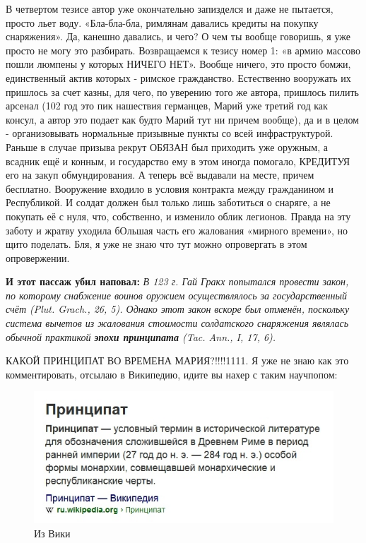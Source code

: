 В четвертом тезисе автор уже окончательно запизделся и даже не пытается, просто льет воду. «Бла-бла-бла, римлянам давались кредиты на покупку снаряжения». Да, канешно давались, и чего? О чем ты вообще говоришь, я уже просто не могу это разбирать. Возвращаемся к тезису номер 1: «в армию массово пошли люмпены у которых НИЧЕГО НЕТ». Вообще ничего, это просто бомжи, единственный актив которых - римское гражданство. Естественно вооружать их пришлось за счет казны, для чего, по уверению того же автора, пришлось пилить арсенал (102 год это пик нашествия германцев, Марий уже третий год как консул, а автор это подает как будто Марий тут ни причем вообще), да и в целом - организовывать нормальные призывные пункты со всей инфраструктурой. Раньше в случае призыва рекрут ОБЯЗАН был приходить уже оружным, а всадник ещё и конным, и государство ему в этом иногда помогало, КРЕДИТУЯ его на закуп обмундирования. А теперь всё выдавали на месте, причем бесплатно. Вооружение входило в условия контракта между гражданином и Республикой. И солдат должен был только лишь заботиться о снаряге, а не покупать её с нуля, что, собственно, и изменило облик легионов. Правда на эту заботу и жратву уходила бОльшая часть его жалования «мирного времени», но щито поделать. Бля, я уже не знаю что тут можно опровергать в этом опровержении.


\textbf{И этот пассаж убил наповал:}
\textit{В 123 г. Гай Гракх попытался провести закон, по которому снабжение воинов оружием осуществлялось за государственный счёт (Plut. Grach., 26, 5). Однако этот закон вскоре был отменён, поскольку система вычетов из жалования стоимости солдатского снаряжения являлась обычной практикой \textbf{эпохи принципата} (Tac. Ann., I, 17, 6).}

КАКОЙ ПРИНЦИПАТ ВО ВРЕМЕНА МАРИЯ?!!!!1111. Я уже не знаю как это комментировать, отсылаю в Википедию, идите вы нахер с таким научпопом:

\begin{figure}[h!tb] 
	\centering\includegraphics[scale=0.6]{Mariy/160169918019293337.png}
	\caption{Из Вики}%
\end{figure}

